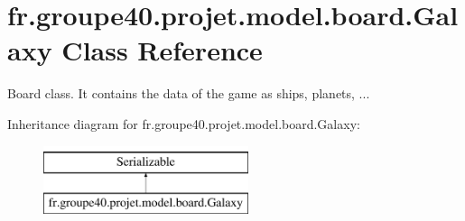 \hypertarget{classfr_1_1groupe40_1_1projet_1_1model_1_1board_1_1_galaxy}{}\section{fr.\+groupe40.\+projet.\+model.\+board.\+Galaxy Class Reference}
\label{classfr_1_1groupe40_1_1projet_1_1model_1_1board_1_1_galaxy}


\textquotesingle{}Board\textquotesingle{} class. It contains the data of the game as ships, planets, ...  


Inheritance diagram for fr.\+groupe40.\+projet.\+model.\+board.\+Galaxy\+:\begin{figure}[H]
\begin{center}
\leavevmode
\includegraphics[height=2.000000cm]{classfr_1_1groupe40_1_1projet_1_1model_1_1board_1_1_galaxy}
\end{center}
\end{figure}
